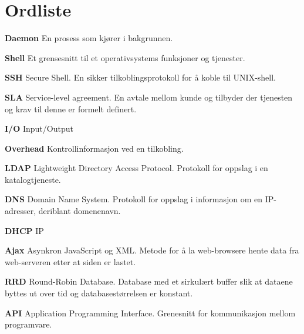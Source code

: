 \chapter*{Ordliste}
{\bf Daemon}
En prosess som kjører i bakgrunnen.

{\bf Shell}
Et grensesnitt til et operativsystems funksjoner og tjenester.

{\bf SSH}
Secure Shell. En sikker tilkoblingsprotokoll for å koble til UNIX-shell.

{\bf SLA}
Service-level agreement. En avtale mellom kunde og tilbyder der tjenesten og krav til denne er formelt definert.

{\bf I/O}
Input/Output

{\bf Overhead}
Kontrollinformasjon ved en tilkobling.

{\bf LDAP}
Lightweight Directory Access Protocol. Protokoll for oppslag i en katalogtjeneste.

{\bf DNS}
Domain Name System. Protokoll for oppslag i informasjon om en IP-adresser, deriblant domenenavn.

{\bf DHCP}
IP

{\bf Ajax}
Asynkron JavaScript og XML. Metode for å la web-browsere hente data fra web-serveren etter at siden er lastet.

{\bf RRD}
Round-Robin Database. Database med et sirkulært buffer slik at dataene byttes ut over tid og databasestørrelsen er konstant.

{\bf API}
Application Programming Interface. Grenesnitt for kommunikasjon mellom programvare.
